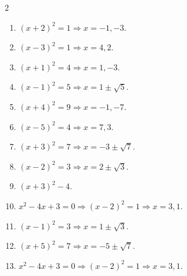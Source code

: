 \documentclass[11pt]{article}
\begin{document}
\begin{keybox}
\begin{multicols}{2}
\small
\begin{enumerate}[leftmargin=*,itemsep=3pt]
  \item $(x+2)^2=1\Rightarrow x=-1,-3$.
  \item $(x-3)^2=1\Rightarrow x=4,2$.
  \item $(x+1)^2=4\Rightarrow x=1,-3$.
  \item $(x-1)^2=5\Rightarrow x=1\pm\sqrt5$.
  \item $(x+4)^2=9\Rightarrow x=-1,-7$.
  \item $(x-5)^2=4\Rightarrow x=7,3$.
  \item $(x+3)^2=7\Rightarrow x=-3\pm\sqrt7$.
  \item $(x-2)^2=3\Rightarrow x=2\pm\sqrt3$.
  \item $(x+3)^2-4$.
  \item $x^2-4x+3=0\Rightarrow (x-2)^2=1\Rightarrow x=3,1$.
  \item $(x-1)^2=3\Rightarrow x=1\pm\sqrt3$.
  \item $(x+5)^2=7\Rightarrow x=-5\pm\sqrt7$.
  \item $x^2-4x+3=0\Rightarrow (x-2)^2=1\Rightarrow x=3,1$.
\end{enumerate}
\end{multicols}
\end{keybox}
\end{document}

